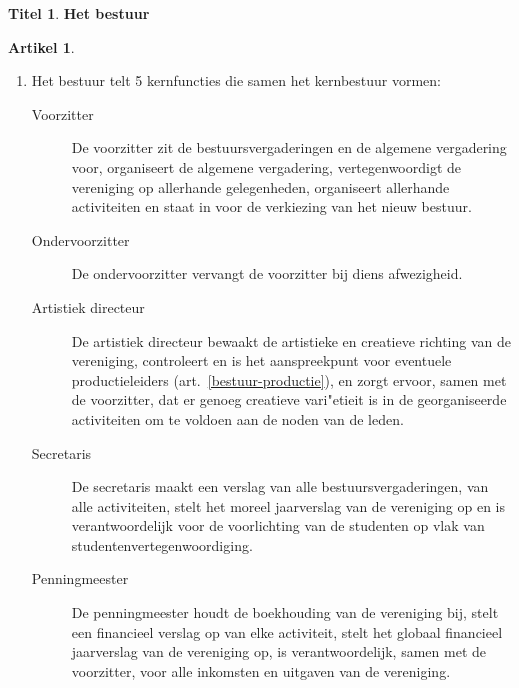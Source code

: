 \documentclass[a4paper,10pt]{article}
\theoremstyle{definition}
\newtheorem{titel}{\newline\Large Titel}
\newtheorem{artikel}{\large Artikel}
\newcommand{\ttext}[1]{\Large \textbf{#1} \normalsize}
\newcommand{\ttextenum}{\mbox{}}
\begin{document}
\begin{titel}\ttext{Het bestuur}

  \begin{artikel}\ttextenum
    \begin{enumerate}
      \item Het bestuur telt 5 kernfuncties die samen het kernbestuur vormen:
      \begin{description}
        \item[Voorzitter]
          De voorzitter zit de bestuursvergaderingen en de algemene vergadering voor, organiseert de algemene vergadering, vertegenwoordigt de vereniging op allerhande gelegenheden, organiseert allerhande activiteiten en staat in voor de verkiezing van het nieuw bestuur.
        \item[Ondervoorzitter]
          De ondervoorzitter vervangt de voorzitter bij diens afwezigheid.
        \item[Artistiek directeur]
          De artistiek directeur bewaakt de artistieke en creatieve richting van de vereniging, controleert en is het aanspreekpunt voor eventuele productieleiders (art.~\ref{bestuur-productie}), en zorgt ervoor, samen met de voorzitter, dat er genoeg creatieve vari"etieit is in de georganiseerde activiteiten om te voldoen aan de noden van de leden.
        \item[Secretaris]
          De secretaris maakt een verslag van alle bestuursvergaderingen, van alle activiteiten, stelt het moreel jaarverslag van de vereniging op en is verantwoordelijk voor de voorlichting van de studenten op vlak van studentenvertegenwoordiging.
        \item[Penningmeester]
          De penningmeester houdt de boekhouding van de vereniging bij, stelt een financieel verslag op van elke activiteit, stelt het globaal financieel jaarverslag van de vereniging op, is verantwoordelijk, samen met de voorzitter, voor alle inkomsten en uitgaven van de vereniging.
      \end{description}


\end{enumerate}
\end{artikel}
\end{titel}
\end{document}
